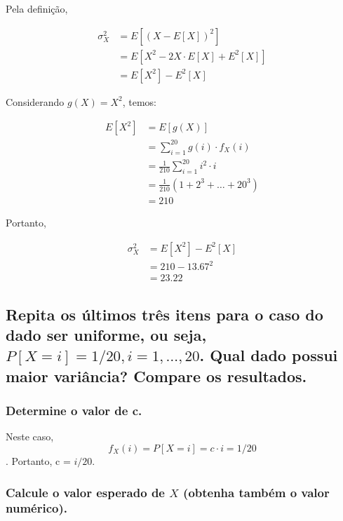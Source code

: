 \documentclass[a4paper]{article}
\begin{document}
Pela definição, 

\begin{equation*}
    \begin{split}
        \sigma_X^2 &= E[(X - E[X])^2]\\
            &= E[X^2 - 2X\cdot E[X] + E^2[X]] \\
            &= E[X^2] - E^2[X]
    \end{split}
\end{equation*}

Considerando $g(X) = X^2$, temos:

\begin{equation*}
    \begin{split}
        E[X^2] &= E[g(X)] \\
            &= \sum_{i = 1}^{20} g(i)\cdot f_X(i) \\
            &= \frac{1}{210}\sum_{i = 1}^{20} i^2\cdot i \\
            &= \frac{1}{210} (1 + 2^3 + \ldots + 20^3) \\
            &= 210
    \end{split}
\end{equation*}

Portanto, 

\begin{equation*}
    \begin{split}
        \sigma_X^2 &= E[X^2] - E^2[X]\\
            &= 210 - 13.67^2 \\
            &= 23.22
    \end{split}
\end{equation*}


\subsection{Repita os últimos três itens para o caso do dado ser uniforme, ou seja, $P[X = i] = 1/20, i = 1, \ldots, 20$. Qual dado possui maior variância? Compare os resultados.}

\subsubsection{Determine o valor de c.}

Neste caso, $$f_X(i) = P[X = i] = c\cdot i = 1/20$$. Portanto, c = $i/20$.

\subsubsection{Calcule o valor esperado de $X$ (obtenha também o valor numérico).}
\end{document}
